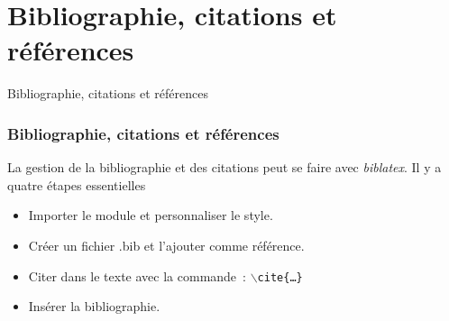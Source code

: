 
\section{Bibliographie, citations et références}

\begin{frame}
    \vfill
    \begin{center}
        \large
        Bibliographie, citations et références
    \end{center}
    \vfill
\end{frame}

\begin{frame}
    \frametitle{Bibliographie, citations et références}
    La gestion de la bibliographie et des citations peut se faire avec \textcolor{vibrant_green}{\textit{biblatex}}\footnotemark. Il y a quatre étapes essentielles
    \vspace{0.3cm}
    \begin{itemize}
    \pause
        \item[$1.$] Importer le module et personnaliser le style.
            \pause
        \item[$2.$] Créer un fichier .bib et l'ajouter comme référence.
            \pause
        \item[$3.$] Citer dans le texte avec la commande~: \texttt{$\backslash$cite\{\dots\}}
            \pause
        \item[$4.$] Insérer la bibliographie.
    \end{itemize}
\end{frame}

